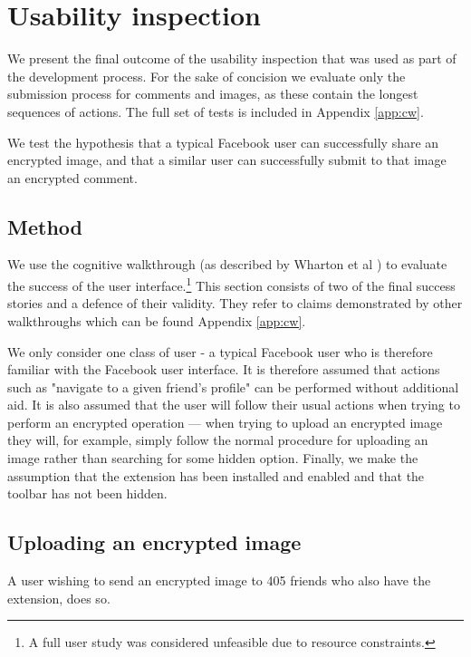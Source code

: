 \FloatBarrier
\section{Usability inspection}
\label{sec:cw}

We present the final outcome of the usability inspection that was used as part of the development process. For the sake of concision we evaluate only the submission process for comments and images, as these contain the longest sequences of actions. The full set of tests is included in Appendix \ref{app:cw}.

We test the hypothesis that a typical Facebook user can successfully share an encrypted image, and that a similar user can successfully submit to that image an encrypted comment.


\subsection{Method}

We use the cognitive walkthrough (as described by Wharton et al \cite{cogwalk}) to evaluate the success of the user interface.\footnote{A full user study was considered unfeasible due to resource constraints.} This section consists of two of the final success stories and a defence of their validity. They refer to claims demonstrated by other walkthroughs which can be found Appendix \ref{app:cw}.

We only consider one class of user - a typical Facebook user who is therefore familiar with the Facebook user interface. It is therefore assumed that actions such as "navigate to a given friend's profile" can be performed without additional aid. It is also assumed that the user will follow their usual actions when trying to perform an encrypted operation --- when trying to upload an encrypted image they will, for example, simply follow the normal procedure for uploading an image rather than searching for some hidden option. Finally, we make the assumption that the extension has been installed and enabled and that the toolbar has not been hidden.


\subsection{Uploading an encrypted image}
A user wishing to send an encrypted image to 405 friends who also have the extension, does so.

